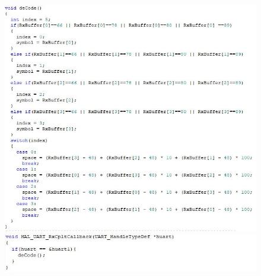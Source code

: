 	\begin{figure}[!h]
	\centering
	\includegraphics[width=\columnwidth]{./Images/Appendix/IMG_15.JPG}
	
	\vspace{0.5cm}
	\includegraphics[width=\columnwidth]{./Images/Appendix/IMG_16.JPG}
	\end{figure}	
